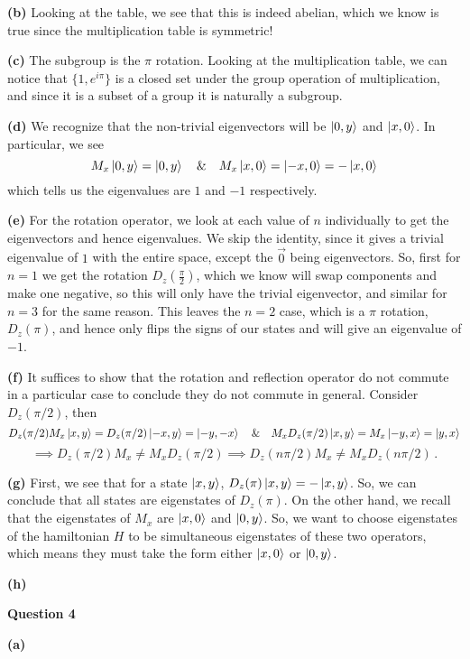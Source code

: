 \documentclass[10pt]{article}
\begin{document}
\textbf{(b)} Looking at the table, we see that this is indeed abelian, which we know is true since the multiplication table is symmetric!

\textbf{(c)} The subgroup is the $\pi$ rotation. Looking at the multiplication table, we can notice that $\{1, e^{i\pi}\}$ is a closed set under the group operation of multiplication, and since it is a subset of a group it is naturally a subgroup. %

\textbf{(d)} We recognize that the non-trivial eigenvectors will be $\ket{0,y}$ and $\ket{x,0}$. In particular, we see
\[ M_{x}\ket{0,y} = \ket{0,y} \quad \& \quad M_{x}\ket{x,0} = \ket{-x,0} = -\ket{x,0} \]
which tells us the eigenvalues are $1$ and $-1$ respectively.

\textbf{(e)} For the rotation operator, we look at each value of $n$ individually to get the eigenvectors and hence eigenvalues. We skip the identity, since it gives a trivial eigenvalue of $1$ with the entire space, except the $\vec{0}$ being eigenvectors. So, first for $n=1$ we get the rotation $D_{z}\left(\frac{\pi}{2}\right)$, which we know will swap components and make one negative, so this will only have the trivial eigenvector, and similar for $n=3$ for the same reason. This leaves the $n=2$ case, which is a $\pi$ rotation, $D_{z}(\pi)$, and hence only flips the signs of our states and will give an eigenvalue of $-1$.

\textbf{(f)} It suffices to show that the rotation and reflection operator do not commute in a particular case to conclude they do not commute in general. Consider $D_{z}(\pi/2)$, then
\[ D_{z}(\pi/2)M_{x}\ket{x,y} = D_{z}(\pi/2)\ket{-x,y} = \ket{-y,-x} \quad \& \quad M_{x}D_{z}(\pi/2)\ket{x,y} = M_{x}\ket{-y,x} = \ket{y,x}\]
\[ \implies D_{z}(\pi/2)M_{x} \neq M_{x}D_{z}(\pi/2) \implies D_{z}(n\pi/2)M_{x} \neq M_{x}D_{z}(n\pi/2)\, .\]

\textbf{(g)} First, we see that for a state $\ket{x,y}$, $D_{z}(\pi)\ket{x,y} = -\ket{x,y}$. So, we can conclude that all states are eigenstates of $D_{z}(\pi)$. On the other hand, we recall that the eigenstates of $M_{x}$ are $\ket{x,0}$ and $\ket{0,y}$. So, we want to choose eigenstates of the hamiltonian $H$ to be simultaneous eigenstates of these two operators, which means they must take the form either $\ket{x,0}$ or $\ket{0,y}$.

\textbf{(h)}


\textbf{Question 4}

\textbf{(a)} 
\end{document}
